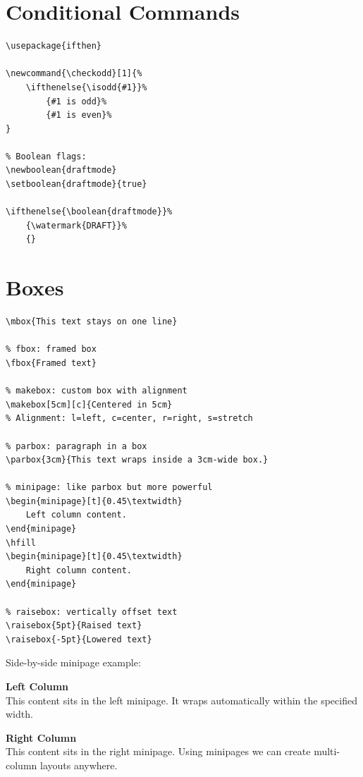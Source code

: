 \section{Conditional Commands}

\begin{lstlisting}[language={[LaTeX]TeX}, caption=Conditionals]
% ifthen package:
\usepackage{ifthen}

\newcommand{\checkodd}[1]{%
    \ifthenelse{\isodd{#1}}%
        {#1 is odd}%
        {#1 is even}%
}

% Boolean flags:
\newboolean{draftmode}
\setboolean{draftmode}{true}

\ifthenelse{\boolean{draftmode}}%
    {\watermark{DRAFT}}%
    {}
\end{lstlisting}

\section{Boxes}

\begin{Verbatim}[frame=single, fontsize=\small, label=Boxes]
% mbox: prevents line breaks
\mbox{This text stays on one line}

% fbox: framed box
\fbox{Framed text}

% makebox: custom box with alignment
\makebox[5cm][c]{Centered in 5cm}
% Alignment: l=left, c=center, r=right, s=stretch

% parbox: paragraph in a box
\parbox{3cm}{This text wraps inside a 3cm-wide box.}

% minipage: like parbox but more powerful
\begin{minipage}[t]{0.45\textwidth}
    Left column content.
\end{minipage}
\hfill
\begin{minipage}[t]{0.45\textwidth}
    Right column content.
\end{minipage}

% raisebox: vertically offset text
\raisebox{5pt}{Raised text}
\raisebox{-5pt}{Lowered text}
\end{Verbatim}

Side-by-side minipage example:

\begin{minipage}[t]{0.45\textwidth}
    \textbf{Left Column}\\
    This content sits in the left minipage. It wraps automatically within the specified width.
\end{minipage}%
\hfill
\begin{minipage}[t]{0.45\textwidth}
    \textbf{Right Column}\\
    This content sits in the right minipage. Using minipages we can create multi-column layouts anywhere.
\end{minipage}
